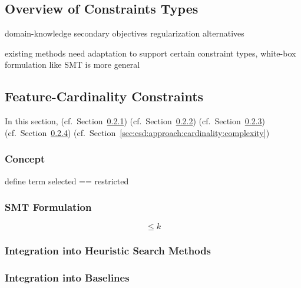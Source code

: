 \documentclass{article}
\theoremstyle{definition}
\begin{document}
\subsection{Overview of Constraints Types}
\label{sec:csd:approach:constraint-types}

domain-knowledge
secondary objectives
regularization
alternatives

existing methods need adaptation to support certain constraint types, white-box formulation like SMT is more general

\subsection{Feature-Cardinality Constraints}
\label{sec:csd:approach:cardinality}

In this section, (cf.~Section~\ref{sec:csd:approach:cardinality:concept}) (cf.~Section~\ref{sec:csd:approach:cardinality:smt}) (cf.~Section~\ref{sec:csd:approach:cardinality:heuristics}) (cf.~Section~\ref{sec:csd:approach:cardinality:baselines}) (cf.~Section~\ref{sec:csd:approach:cardinality:complexity})

\cite{mosek2022modeling}
\cite{sinz2005towards}
\cite{ulrich2022selecting}

\subsubsection{Concept}
\label{sec:csd:approach:cardinality:concept}

define term selected == restricted

\subsubsection{SMT Formulation}
\label{sec:csd:approach:cardinality:smt}

\begin{equation}
	\leq k
	\label{eq:csd:cardinality-constraint}
\end{equation}

\subsubsection{Integration into Heuristic Search Methods}
\label{sec:csd:approach:cardinality:heuristics}

\subsubsection{Integration into Baselines}
\label{sec:csd:approach:cardinality:baselines}
\end{document}
